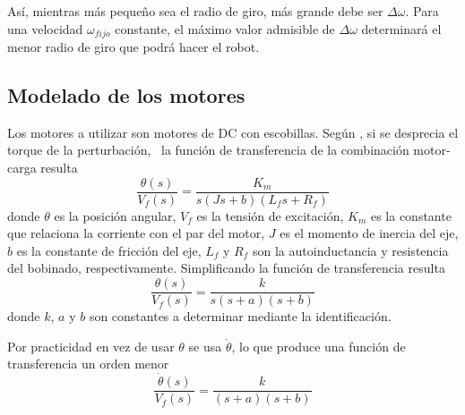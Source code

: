 \documentclass[10pt,conference,a4paper,onecolumn]{article}%
\begin{document}
Así, mientras más pequeño sea el radio de giro, más grande debe ser $\Delta \omega$. Para una velocidad $\omega_{fijo}$ constante, el máximo valor admisible de $\Delta \omega$ determinará el menor radio de giro que podrá hacer el robot.

 \subsection{Modelado de los motores}
 \label{modeloMotores}
 
 Los motores a utilizar son motores de DC con escobillas. Según \cite[pág. 58-59]{dorf}, si se desprecia el torque de la perturbación,%
\ la función de transferencia de la combinación motor-carga resulta
 \begin{equation*}
 \frac{\theta(s)}{V_f(s)}=\frac{K_m}{s(Js+b)(L_fs+R_f)}
 \end{equation*}
 donde $\theta$ es la posición angular, $V_f$ es la tensión de excitación, $K_m$ es la constante que relaciona la corriente con el par del motor, $J$ es el momento de inercia del eje, $b$ es la constante de fricción del eje, $L_f$  y $R_f$ son la autoinductancia y resistencia del bobinado, respectivamente. Simplificando la función de transferencia resulta
 \begin{equation*}
 \frac{\theta(s)}{V_f(s)}=\frac{k}{s(s+a)(s+b)}
 \end{equation*}
 donde $k$, $a$ y $b$ son constantes a determinar mediante la identificación.
 
Por practicidad en vez de usar $\theta$ se usa $\dot{\theta}$, lo que produce una  función de transferencia un orden menor  
 \begin{equation}
 \frac{\dot{\theta}(s)}{V_f(s)}=\frac{k}{(s+a)(s+b)}
 \end{equation}
  
\end{document}
